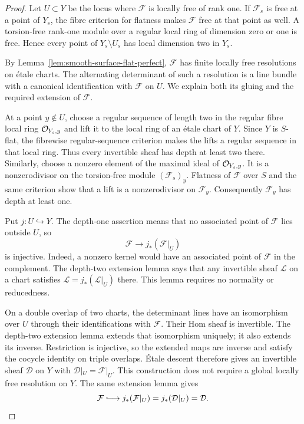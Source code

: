 \begin{proof}
Let $U\subset Y$ be the locus where $\mathcal F$ is locally free of
rank one. If $\mathcal F_s$ is free at a point of $Y_s$, the fibre
criterion for flatness makes $\mathcal F$ free at that point as well.
A torsion-free rank-one module over a regular local ring of dimension
zero or one is free. Hence every point of $Y_s\setminus U_s$ has local
dimension two in $Y_s$.

By Lemma~\ref{lem:smooth-surface-flat-perfect}, $\mathcal F$ has finite
locally free resolutions on \textup{\'etale} charts. The alternating
determinant of such a resolution is a line bundle with a canonical
identification with $\mathcal F$ on $U$. We explain both its gluing
and the required extension of $\mathcal F$.

At a point $y\notin U$, choose a regular sequence of length two in
the regular fibre local ring $\mathcal O_{Y_s,y}$ and lift it to the local
ring of an \textup{\'etale} chart of $Y$. Since $Y$ is $S$-flat, the
fibrewise regular-sequence criterion
\cite[IV$_3$, 11.3.8]{EGA} makes the lifts a regular sequence in that
local ring. Thus every invertible sheaf has depth at least two there.
Similarly, choose a nonzero element of the maximal ideal of
$\mathcal O_{Y_s,y}$. It is a nonzerodivisor on the torsion-free module
$(\mathcal F_s)_y$. Flatness of $\mathcal F$ over $S$ and the same
criterion show that a lift is a nonzerodivisor on $\mathcal F_y$.
Consequently $\mathcal F_y$ has depth at least one.

Put $j:U\hookrightarrow Y$. The depth-one assertion means that no
associated point of $\mathcal F$ lies outside $U$, so
\[
 \mathcal F\longrightarrow j_*(\mathcal F|_U)
\]
is injective. Indeed, a nonzero kernel would have an associated point
of $\mathcal F$ in the complement. The depth-two extension lemma
\cite[Tag~0E9I]{Stacks} says that any invertible sheaf $\mathcal L$
on a chart satisfies $\mathcal L=j_*(\mathcal L|_U)$ there.
This lemma requires no normality or reducedness.

On a double overlap of two charts, the determinant lines have an
isomorphism over $U$ through their identifications with $\mathcal F$.
Their Hom sheaf is invertible. The depth-two extension lemma extends
that isomorphism uniquely; it also extends its inverse. Restriction
is injective, so the extended maps are inverse and satisfy the cocycle
identity on triple overlaps. \textup{\'Etale} descent therefore gives
an invertible sheaf $\mathcal D$ on $Y$ with
$\mathcal D|_U=\mathcal F|_U$. This construction does not require a
global locally free resolution on $Y$. The same extension lemma gives
\[
 \mathcal F\lhook\joinrel\longrightarrow
 j_*(\mathcal F|_U)=j_*(\mathcal D|_U)=\mathcal D.
\]


\end{proof}
